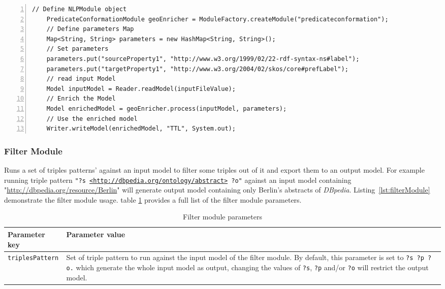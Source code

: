 \documentclass[a4paper,twoside,bibtotoc,abstracton,12pt,BCOR=15mm]{article}
\begin{document}
        \begin{lstlisting}[label=lst:pConf, float=tp, numbers=left, numberstyle=\tiny, caption = Code fragment to call the \texttt{PredicateConformationModule} class.]
    // Define NLPModule object
    PredicateConformationModule geoEnricher = ModuleFactory.createModule("predicateconformation");
    // Define parameters Map
    Map<String, String> parameters = new HashMap<String, String>();
    // Set parameters
    parameters.put("sourceProperty1", "http://www.w3.org/1999/02/22-rdf-syntax-ns#label");
    parameters.put("targetProperty1", "http://www.w3.org/2004/02/skos/core#prefLabel");
    // read input Model
    Model inputModel = Reader.readModel(inputFileValue);
    // Enrich the Model
    Model enrichedModel = geoEnricher.process(inputModel, parameters);
    // Use the enriched model
    Writer.writeModel(enrichedModel, "TTL", System.out);
    \end{lstlisting}

\subsubsection{Filter Module}
    Runs a set of triples patterns' against an input model to filter some triples out of it and export them to an output model. 
    For example running triple pattern \texttt{"?s \url{<http://dbpedia.org/ontology/abstract>} ?o"} against an input model containing "\url{http://dbpedia.org/resource/Berlin}" will generate output model containing only Berlin's abstracts of \emph{DBpedia}.
    Listing~\ref{lst:filterModule} demonstrate the filter module usage.
    table \ref{tbl:filterPram} provides a full list of the filter module parameters.

    \begin{table}
    \caption{Filter module parameters} \label{tbl:filterPram}
    \small
    \begin{tabularx}{\textwidth}{@{}lX@{}}
    \toprule
    \textbf{Parameter key} 	& \textbf{Parameter value} \\
    \toprule
    \texttt{triplesPattern}	& Set of triple pattern to run against the input model of the filter module. By default, this parameter is set to \texttt{?s ?p ?o.} which generate the whole input model as output, changing the values of \texttt{?s}, \texttt{?p} and/or \texttt{?o} will restrict the output model.\\
    \bottomrule
    \end{tabularx}
    \end{table}
    
\end{document}
